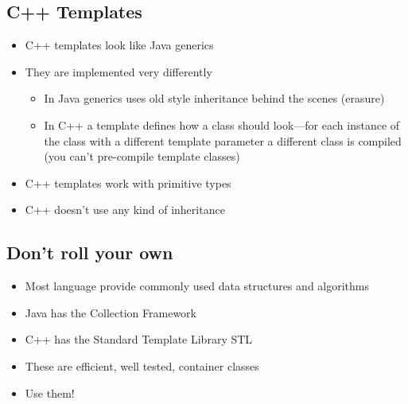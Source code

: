\begin{slide}
\section{C++ Templates}

\begin{PauseHighLight}
  \begin{itemize}
  \item C++ templates look like Java generics\pause
  \item They are implemented very differently\pause
    \begin{itemize}
    \item In Java generics uses old style inheritance behind the scenes
      (erasure)\pause
    \item In C++ a template defines how a class should look---for each
      instance of the class with a different template parameter a
      different class is compiled (you can't pre-compile template
      classes)\pause
    \end{itemize}
  \item C++ templates work with primitive types\pause
  \item C++ doesn't use any kind of inheritance\pause
  \end{itemize}
\end{PauseHighLight}

\end{slide}



\Outline

\begin{slide}
\section{Don't roll your own}

\begin{PauseHighLight}
  \begin{itemize}
  \item Most language provide commonly used data structures and
    algorithms\pause
  \item Java has the Collection Framework\pause
  \item C++ has the Standard Template Library STL\pause
  \item These are efficient, well tested, container classes\pause
  \item Use them!\pause
  \end{itemize}
\end{PauseHighLight}
\end{slide}

